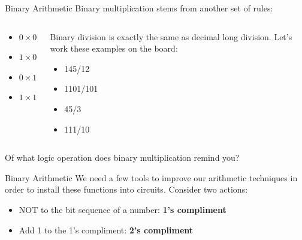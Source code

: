 \documentclass{beamer}
\begin{document}
\begin{frame}{Binary Arithmetic}
Binary multiplication stems from another set of rules: \\ \vspace{0.5cm}
\hrulefill
\begin{columns}[T]
\begin{column}{0.5\textwidth}
\begin{itemize}
\item $0\times 0=0$
\item $1\times 0=0$
\item $0\times 1=0$
\item $1\times 1=1$
\end{itemize}
\end{column}
\begin{column}{0.5\textwidth}
\small
Binary division is exactly the same as decimal long division.  Let's work these examples on the board:
\begin{itemize}
\item 145/12
\item 1101/101
\item 45/3
\item 111/10
\end{itemize}
\end{column}
\end{columns}
\small
Of what logic operation does binary multiplication remind you?
\end{frame}

\begin{frame}{Binary Arithmetic}
We need a few tools to improve our arithmetic techniques in order to install these functions into circuits.  Consider two actions:
\begin{itemize}
\item NOT to the bit sequence of a number: \textbf{\alert{1's compliment}}
\item Add 1 to the 1's compliment: \textbf{\alert{2's compliment}}
\end{itemize}
\end{frame}
\end{document}

